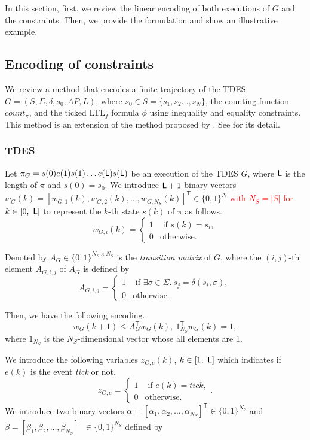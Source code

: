 \documentclass[journal,twoside,web]{IEEEtran}
\newcommand{\Len}{{\sf L}}
\newcommand{\red}[1]{\textcolor{red}{#1}}
\begin{document}
In this section, first, we review the linear encoding of both executions of $G$ and the constraints.  Then, we provide the formulation and show an illustrative example.

\subsection{Encoding of constraints}\label{encode}
%
We review a method that encodes a finite trajectory of the TDES $G=(S, \Sigma, \delta, s_{0}, AP, L)$, where $s_{0} \in S= \{s_1, s_2 \ldots, s_{N} \}$, the counting function $count_\pi$, and the ticked LTL$_f$ formula $\phi$ using inequality and equality constraints.
This method is an extension of the method proposed by \cite{BHJLS2006}.  See \cite{KHU2020} for its detail.
%
\subsubsection{TDES}
Let $\pi_{G}=s(0)e(1)s(1) \ldots e(\Len)s(\Len)$ be an execution of the TDES $G$, where $\Len$ is the length of $\pi$ and $s(0)=s_{0}$.
We introduce $\Len+1$ binary vectors $w_G (k)=[w_{G,1} (k), w_{G,2} (k) , \ldots , w_{G,N_S} (k) ]^{\mathsf{T}} \in \{0, 1\}^{N}$ \red{with $N_S=|S|$ for} $k\in [0,\ \Len]$ to represent the $k$-th state $s(k)$ of $\pi$ as follows.
\[
w_{G,i}(k)=\left\{ \begin{array}{ll}
1 & \mbox{ if } s(k)=s_i, \\
0 & \mbox{otherwise.}
\end{array} \right.
\]

Denoted by $A_G \in \{0, 1\}^{N_S \times N_S}$ is the \textit{transition matrix} of  $G$, where the $(i,j)$-th element $A_{G,i,j}$ of $A_G$ is defined by
\[
A_{G,i,j}=\left\{ \begin{array}{ll}
1 & \mbox{ if } \exists \sigma \in \Sigma.\ s_j=\delta(s_i, \sigma), \\
0 & \mbox{otherwise.}
\end{array} \right.
\]
 

Then, we have the following encoding.
\begin{equation}\label{w}
w_G(k+1) \leq A_{G}^{\mathsf{T}} w_G(k), \ {1}^\mathsf{T} _{N_S} w_G(k) =1, 
\end{equation}
where ${1}_{N_S}$ is the $N_S$-dimensional vector whose all elements are 1.
%
%

We introduce the following variables $z_{G,e}(k)$, $k\in[1,\ \Len]$ which indicates if $e(k)$ is the event \textit{tick} or not.
\[
z_{G,e}=\left\{ \begin{array}{ll}
1 & \mbox{ if } e(k)=tick, \\
0 & \mbox{otherwise.}
\end{array} \right. .
\]
We introduce two binary vectors $\alpha=[\alpha_1, \alpha_2,\ldots , \alpha_{N_S}]^{\mathsf{T}} \in \{0, 1\}^{{N_S}}$ and  $\beta=[\beta_1, \beta_2,\ldots , \beta_{N_S}]^{\mathsf{T}} \in \{0, 1\}^{{N_S}}$ defined by
\end{document}
